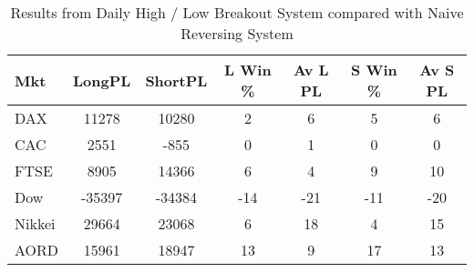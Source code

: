 \begin{table}[ht]
\centering
\caption[Daily High / Low Breakout System compared with Naive Reversing System]{Results from Daily High / Low Breakout System compared with Naive Reversing System} 
\label{tab:hl_bout_sys_diff}
\begin{tabular}{lcccccc}
  \toprule Mkt & LongPL & ShortPL & L Win \% & Av L PL & S Win \% & Av S PL \\ 
  \midrule DAX & 11278 & 10280 & 2 & 6 & 5 & 6 \\ 
  CAC & 2551 & -855 & 0 & 1 & 0 & 0 \\ 
  FTSE & 8905 & 14366 & 6 & 4 & 9 & 10 \\ 
  Dow & -35397 & -34384 & -14 & -21 & -11 & -20 \\ 
  Nikkei & 29664 & 23068 & 6 & 18 & 4 & 15 \\ 
  AORD & 15961 & 18947 & 13 & 9 & 17 & 13 \\ 
   \bottomrule \end{tabular}
\end{table}
